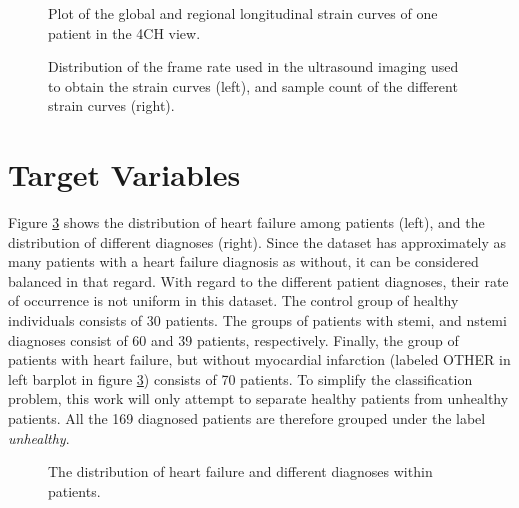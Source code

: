 \begin{figure}[h]
    \centering
    
    \caption{Plot of the global and regional longitudinal strain curves of one patient in the 4CH view.}
    \label{fig:strain_curves}
\end{figure}

\begin{figure}
    \centering
    
    \caption{Distribution of the frame rate used in the ultrasound imaging used to obtain the strain curves (left), and sample count of the different strain curves (right).}
    \label{fig:fr_sample_dist}
\end{figure}

\newpage

\section{Target Variables} \label{sec:target}
Figure \ref{fig:hf_ind_dist} shows the distribution of heart failure among patients (left), and the distribution of different diagnoses (right). Since the dataset has approximately as many patients with a heart failure diagnosis as without, it can be considered balanced in that regard. With regard to the different patient diagnoses, their rate of occurrence is not uniform in this dataset. The control group of healthy individuals consists of 30 patients. The groups of patients with \acrshort{stemi}, and \acrshort{nstemi} diagnoses consist of 60 and 39 patients, respectively. Finally, the group of patients with heart failure, but without myocardial infarction (labeled OTHER in left barplot in figure \ref{fig:hf_ind_dist}) consists of 70 patients. To simplify the classification problem, this work will only attempt to separate healthy patients from unhealthy patients. All the 169 diagnosed patients are therefore grouped under the label \textit{unhealthy}. \bigskip

\begin{figure}[h]
    \centering
    
    \caption{The distribution of heart failure and different diagnoses within patients.}
    \label{fig:hf_ind_dist}
\end{figure}

